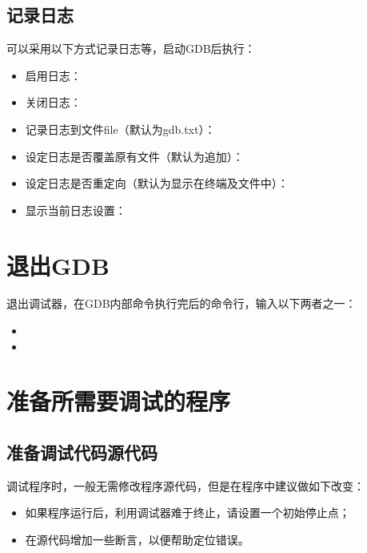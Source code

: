 \documentclass[a4paper,12pt,english]{sphinxmanual}
\begin{document}
\subsection{记录日志}
\label{\detokenize{debug/debug:id4}}
\sphinxAtStartPar
可以采用以下方式记录日志等，启动GDB后执行：
\begin{itemize}
\item {} 
\sphinxAtStartPar
启用日志：

\item {} 
\sphinxAtStartPar
关闭日志：

\item {} 
\sphinxAtStartPar
记录日志到文件file（默认为gdb.txt）：

\item {} 
\sphinxAtStartPar
设定日志是否覆盖原有文件（默认为追加）：

\item {} 
\sphinxAtStartPar
设定日志是否重定向（默认为显示在终端及文件中）：

\item {} 
\sphinxAtStartPar
显示当前日志设置：

\end{itemize}


\section{退出GDB}
\label{\detokenize{debug/debug:id5}}
\sphinxAtStartPar
退出调试器，在GDB内部命令执行完后的命令行，输入以下两者之一：
\begin{itemize}
\item {} 
\sphinxAtStartPar
{}

\item {} 
\sphinxAtStartPar
{}

\end{itemize}


\section{准备所需要调试的程序}
\label{\detokenize{debug/debug:id6}}

\subsection{准备调试代码源代码}
\label{\detokenize{debug/debug:id7}}
\sphinxAtStartPar
调试程序时，一般无需修改程序源代码，但是在程序中建议做如下改变：
\begin{itemize}
\item {} 
\sphinxAtStartPar
如果程序运行后，利用调试器难于终止，请设置一个初始停止点；

\item {} 
\sphinxAtStartPar
在源代码增加一些断言，以便帮助定位错误。

\end{itemize}
\end{document}
